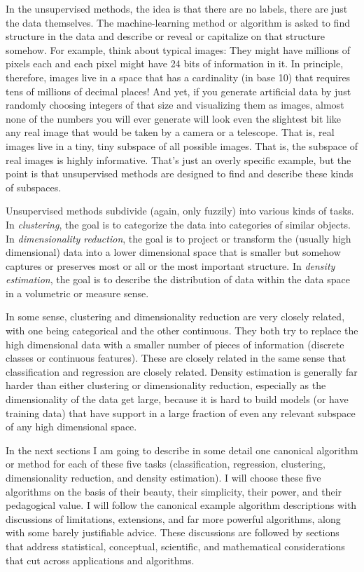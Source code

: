 \documentclass[12pt, twoside, letterpaper]{article}
\begin{document}
In the unsupervised methods, the idea is that there are no labels,
there are just the data themselves.
The machine-learning method or algorithm is asked to find
structure in the data and describe or reveal or capitalize on that
structure somehow.
For example, think about typical images: They might have millions
of pixels each and each pixel might have 24 bits of information in it.
In principle, therefore, images live in a space that has a cardinality
(in base 10) that requires tens of millions of decimal places!
And yet, if you generate artificial data by just randomly choosing
integers of that size and visualizing them as images, almost none of
the numbers you will ever generate will look even the slightest bit
like any real image that would be taken by a camera or a telescope.
That is, real images live in a tiny, tiny subspace of all possible
images.
That is, the subspace of real images is highly informative.
That's just an overly specific example, but the point is that
unsupervised methods are designed to find and describe these kinds of subspaces.

Unsupervised methods subdivide (again, only fuzzily) into various
kinds of tasks.
In \emph{clustering}, the goal is to categorize the data into categories
of similar objects.
In \emph{dimensionality reduction}, the goal is to project or
transform the (usually high dimensional) data into a lower dimensional
space that is smaller but somehow captures or preserves most or all or
the most important structure.
In \emph{density estimation}, the goal is to describe the distribution
of data within the data space in a volumetric or measure sense.

In some sense, clustering and dimensionality reduction are very closely
related, with one being categorical and the other continuous.
They both try to replace the high dimensional data with a smaller number of
pieces of information (discrete classes or continuous features).
These are closely related in the
same sense that classification and regression are closely related.
Density estimation is generally far harder than either clustering
or dimensionality reduction, especially as the dimensionality of the
data get large, because it is hard to build models (or have training
data) that have support in a large fraction of even any relevant
subspace of any high dimensional space.

In the next sections I am going to describe in some detail one
canonical algorithm or method for each of these five tasks
(classification, regression, clustering, dimensionality reduction,
and density estimation).
I will choose these five algorithms on the basis of their beauty, their
simplicity, their power, and their pedagogical value.
I will follow the canonical example algorithm descriptions with discussions
of limitations, extensions, and far more powerful algorithms, along
with some barely justifiable advice.
These discussions are followed by sections that address statistical,
conceptual, scientific, and mathematical considerations that cut
across applications and algorithms.
\end{document}
